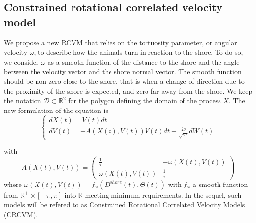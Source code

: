 \documentclass[11pt]{article}
\newcommand {\R}{\mathbb{R}}
\newcommand {\1}{\mathbb{1}}
\theoremstyle{definition}
\theoremstyle{remark}
\theoremstyle{remark}
\begin{document}
\subsection{Constrained rotational correlated velocity model}
\label{section: CRCVM}

We propose a new RCVM that relies on the tortuosity parameter, or angular velocity $\omega$, to describe how the animals turn in reaction to the shore. 
To do so, we consider $\omega$ as a smooth function of the distance to the shore and the angle between the velocity vector and the shore normal vector. 
The smooth function should be non zero close to the shore, that is when a change of direction due to the proximity of the shore is expected, and  zero far away from the shore. 
We keep the notation $\mathcal{D} \subset \R^2$ for the polygon defining the domain of the process $X$. The new formulation of the equation is 
\begin{equation} \left\{
	\begin{array}{l}
		dX(t)=V(t) dt \\
		dV(t)=-A(X(t),V(t))V(t)dt+\frac{2\nu}{\sqrt{\pi \tau}} dW(t) 
		
	\end{array}
	\right.
	\label{eq: CRCVM equation}
\end{equation}

with 
\begin{equation} 
		A(X(t),V(t))=\begin{pmatrix} 
			\frac{1}{\tau} & -\omega(X(t),V(t)) \\
			\omega(X(t),V(t)) & \frac{1}{\tau}
		\end{pmatrix}
	\label{eq: CRCVM matrix A}
\end{equation}
where $\omega(X(t),V(t))=f_{\omega}(D^{shore}(t),\Theta(t))$ with  $f_{\omega}$ a smooth function from $\R^{+} \times [-\pi,\pi]$ into $\R$ meeting minimum requirements. In the sequel, such models will be refered to as Constrained Rotational Correlated Velocity Models (CRCVM).\\
\end{document}
